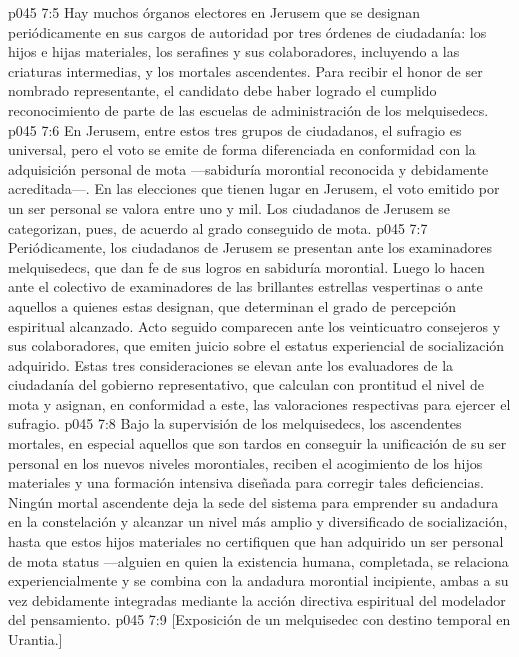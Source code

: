 \vs p045 7:5 \pc Hay muchos órganos electores en Jerusem que se designan periódicamente en sus cargos de autoridad por tres órdenes de ciudadanía: los hijos e hijas materiales, los serafines y sus colaboradores, incluyendo a las criaturas intermedias, y los mortales ascendentes. Para recibir el honor de ser nombrado representante, el candidato debe haber logrado el cumplido reconocimiento de parte de las escuelas de administración de los melquisedecs.
\vs p045 7:6 En Jerusem, entre estos tres grupos de ciudadanos, el sufragio es universal, pero el voto se emite de forma diferenciada en conformidad con la adquisición personal de mota ---sabiduría morontial reconocida y debidamente acreditada---. En las elecciones que tienen lugar en Jerusem, el voto emitido por un ser personal se valora entre uno y mil. Los ciudadanos de Jerusem se categorizan, pues, de acuerdo al grado conseguido de mota.
\vs p045 7:7 Periódicamente, los ciudadanos de Jerusem se presentan ante los examinadores melquisedecs, que dan fe de sus logros en sabiduría morontial. Luego lo hacen ante el colectivo de examinadores de las brillantes estrellas vespertinas o ante aquellos a quienes estas designan, que determinan el grado de percepción espiritual alcanzado. Acto seguido comparecen ante los veinticuatro consejeros y sus colaboradores, que emiten juicio sobre el estatus experiencial de socialización adquirido. Estas tres consideraciones se elevan ante los evaluadores de la ciudadanía del gobierno representativo, que calculan con prontitud el nivel de mota y asignan, en conformidad a este, las valoraciones respectivas para ejercer el sufragio.
\vs p045 7:8 \pc Bajo la supervisión de los melquisedecs, los ascendentes mortales, en especial aquellos que son tardos en conseguir la unificación de su ser personal en los nuevos niveles morontiales, reciben el acogimiento de los hijos materiales y una formación intensiva diseñada para corregir tales deficiencias. Ningún mortal ascendente deja la sede del sistema para emprender su andadura en la constelación y alcanzar un nivel más amplio y diversificado de socialización, hasta que estos hijos materiales no certifiquen que han adquirido un ser personal de mota status ---alguien en quien la existencia humana, completada, se relaciona experiencialmente y se combina con la andadura morontial incipiente, ambas a su vez debidamente integradas mediante la acción directiva espiritual del modelador del pensamiento.
\vsetoff
\vs p045 7:9 [Exposición de un melquisedec con destino temporal en Urantia.]
